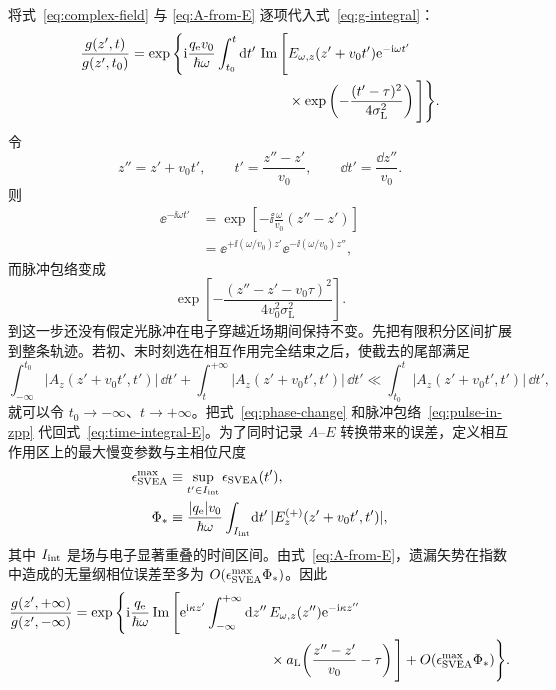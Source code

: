 将式~\cref{eq:complex-field} 与 \cref{eq:A-from-E} 逐项代入式~\cref{eq:g-integral}：
\begin{align}
 \frac{g(z',t)}{g(z',t_0)}
 =\exp\Bigg\{\mathrm{i}\frac{q_{\rm e}v_0}{\hbar\omega}
 \int_{t_0}^{t}\mathrm{d} t'\,
 \operatorname{Im}\Bigg[
 &E_{\omega,z}(z'+v_0t')\mathrm{e}^{-\mathrm{i}\omega t'}\notag\\
 &\times\exp\left(-\frac{(t'-\tau)^2}{4\sigma_{\mathrm L}^2}\right)
 \Bigg]\Bigg\}.
 \label{eq:time-integral-E}
\end{align}
令
\begin{equation}
 z''=z'+v_0t',
 \qquad
 t'=\frac{z''-z'}{v_0},
 \qquad
 \dd t'=\frac{\dd z''}{v_0}.
 \label{eq:zpp-change}
\end{equation}
则
\begin{align}
 \ee^{-\ii\omega t'}
 &=\exp\left[-\ii\frac{\omega}{v_0}(z''-z')\right]\\
 &=\ee^{+\ii(\omega/v_0)z'}
 \ee^{-\ii(\omega/v_0)z''},
 \label{eq:phase-change}
\end{align}
而脉冲包络变成
\begin{equation}
 \exp\left[-\frac{(z''-z'-v_0\tau)^2}{4v_0^2\sigma_{\mathrm L}^2}\right].
 \label{eq:pulse-in-zpp}
\end{equation}
到这一步还没有假定光脉冲在电子穿越近场期间保持不变。先把有限积分区间扩展到整条轨迹。若初、末时刻选在相互作用完全结束之后，使截去的尾部满足
\begin{equation}
 {
 \int_{-\infty}^{t_0}\!|A_z(z'+v_0t',t')|\,\dd t'
 +\int_t^{+\infty}\!|A_z(z'+v_0t',t')|\,\dd t'
 \ll
 \int_{t_0}^{t}\!|A_z(z'+v_0t',t')|\,\dd t',}
 \label{eq:infinite-limit-condition}
\end{equation}
就可以令 $t_0\to-\infty$、$t\to+\infty$。把式~\cref{eq:phase-change} 和脉冲包络~\cref{eq:pulse-in-zpp} 代回式~\cref{eq:time-integral-E}。为了同时记录 $A$--$E$ 转换带来的误差，定义相互作用区上的最大慢变参数与主相位尺度
\begin{align}
\epsilon_{\rm SVEA}^{\max}
&\equiv \sup_{t'\in I_{\rm int}}\epsilon_{\rm SVEA}(t'),\\
\Phi_*
&\equiv
\frac{|q_{\rm e}|v_0}{\hbar\omega}
\int_{I_{\rm int}}\!\mathrm{d} t'\,
|E_z^{(+)}(z'+v_0t',t')|,
\label{eq:pulse-phase-error-scale}
\end{align}
其中 $I_{\rm int}$ 是场与电子显著重叠的时间区间。由式~\cref{eq:A-from-E}，遗漏矢势在指数中造成的无量纲相位误差至多为 $O(\epsilon_{\rm SVEA}^{\max}\Phi_*)$。因此
\begin{align}
\frac{g(z',+\infty)}{g(z',-\infty)}
=\exp\Bigg\{
\mathrm{i}\frac{q_{\rm e}}{\hbar\omega}
\operatorname{Im}\Bigg[
\mathrm{e}^{\mathrm{i}\kappa z'}
\int_{-\infty}^{+\infty}\mathrm{d} z''\,
&E_{\omega,z}(z'')\mathrm{e}^{-\mathrm{i}\kappa z''}\\
&\times
 a_{\rm L}\!\left(\frac{z''-z'}{v_0}-\tau\right)
\Bigg]
+O(\epsilon_{\rm SVEA}^{\max}\Phi_*)
\Bigg\}.
\label{eq:pulse-phase-before-freeze}
\end{align}
